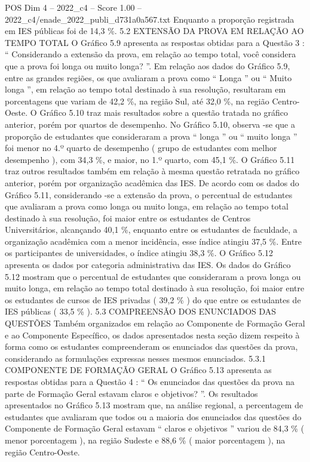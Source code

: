 \begin{textsample}{POS Dim 4 – 2022\_c4 – Score 1.00 – 2022\_c4/enade\_2022\_publi\_d731a0a567.txt}
Enquanto a proporção registrada em IES públicas foi de 14,3 \%. 5.2 EXTENSÃO DA PROVA EM RELAÇÃO AO TEMPO TOTAL O Gráfico 5.9 apresenta as respostas obtidas para a Questão 3 : “ Considerando a extensão da prova, em relação ao tempo total, você considera que a prova foi longa ou muito longa? ”.
Em relação aos dados do Gráfico 5.9, entre as grandes regiões, os que avaliaram a prova como “ Longa ” ou “ Muito longa ”, em relação ao tempo total destinado à sua resolução, resultaram em porcentagens que variam de 42,2 \%, na região Sul, até 32,0 \%, na região Centro-Oeste.
O Gráfico 5.10 traz mais resultados sobre a questão tratada no gráfico anterior, porém por quartos de desempenho.
No Gráfico 5.10, observa -se que a proporção de estudantes que consideraram a prova “ longa ” ou “ muito longa ” foi menor no 4.º quarto de desempenho ( grupo de estudantes com melhor desempenho ), com 34,3 \%, e maior, no 1.º quarto, com 45,1 \%.
O Gráfico 5.11 traz outros resultados também em relação à mesma questão retratada no gráfico anterior, porém por organização acadêmica das IES.
De acordo com os dados do Gráfico 5.11, considerando -se a extensão da prova, o percentual de estudantes que avaliaram a prova como longa ou muito longa, em relação ao tempo total destinado à sua resolução, foi maior entre os estudantes de Centros Universitários, alcançando 40,1 \%, enquanto entre os estudantes de faculdade, a organização acadêmica com a menor incidência, esse índice atingiu 37,5 \%.
Entre os participantes de universidades, o índice atingiu 38,3 \%.
O Gráfico 5.12 apresenta os dados por categoria administrativa das IES.
Os dados do Gráfico 5.12 mostram que o percentual de estudantes que consideraram a prova longa ou muito longa, em relação ao tempo total destinado à sua resolução, foi maior entre os estudantes de cursos de IES privadas ( 39,2 \% ) do que entre os estudantes de IES públicas ( 33,5 \% ). 5.3 COMPREENSÃO DOS ENUNCIADOS DAS QUESTÕES Também organizados em relação ao Componente de Formação Geral e ao Componente Específico, os dados apresentados nesta seção dizem respeito à forma como os estudantes compreenderam os enunciados das questões da prova, considerando as formulações expressas nesses mesmos enunciados. 5.3.1 COMPONENTE DE FORMAÇÃO GERAL O Gráfico 5.13 apresenta as respostas obtidas para a Questão 4 : “ Os enunciados das questões da prova na parte de Formação Geral estavam claros e objetivos? ”.
Os resultados apresentados no Gráfico 5.13 mostram que, na análise regional, a percentagem de estudantes que avaliaram que todos ou a maioria dos enunciados das questões do Componente de Formação Geral estavam “ claros e objetivos ” variou de 84,3 \% ( menor porcentagem ), na região Sudeste e 88,6 \% ( maior porcentagem ), na região Centro-Oeste.

\end{textsample}
